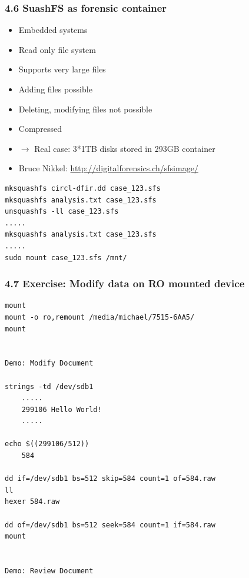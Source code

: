 \begin{frame}[fragile]
  \frametitle{4.6 SuashFS as forensic container}
    \begin{itemize}
        \item Embedded systems
        \item Read only file system
        \item Supports very large files
        \item Adding files possible
        \item Deleting, modifying files not possible
        \item Compressed
	\item[] $\to$ Real case: 3*1TB disks stored in 293GB container
	\item Bruce Nikkel: \url{http://digitalforensics.ch/sfsimage/}
    \end{itemize}
  \begin{lstlisting}[basicstyle=\tiny]
mksquashfs circl-dfir.dd case_123.sfs
mksquashfs analysis.txt case_123.sfs
unsquashfs -ll case_123.sfs
.....
mksquashfs analysis.txt case_123.sfs
.....
sudo mount case_123.sfs /mnt/
  \end{lstlisting}
\end{frame}


\begin{frame}[fragile]
  \frametitle{4.7 Exercise: Modify data on RO mounted device}
  \begin{lstlisting}[basicstyle=\tiny]
mount
mount -o ro,remount /media/michael/7515-6AA5/
mount


Demo: Modify Document

strings -td /dev/sdb1
    .....
    299106 Hello World!
    .....

echo $((299106/512))
    584

dd if=/dev/sdb1 bs=512 skip=584 count=1 of=584.raw
ll
hexer 584.raw

dd of=/dev/sdb1 bs=512 seek=584 count=1 if=584.raw
mount


Demo: Review Document
  
  
  \end{lstlisting}
\end{frame}


